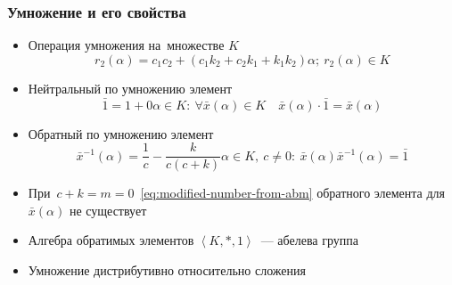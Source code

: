 \documentclass[12pt]{beamer}
\begin{document}
\begin{frame}
  \frametitle{Умножение и его свойства}
  \begin{itemize}
    \item Операция умножения на~множестве $K$
      \begin{equation}
      \label{eq:fuzzy-multiplication}
        r_2\left( \alpha \right)=c_1 c_2+\left(c_1 k_2+ c_2 k_1 +k_1 k_2 \right)\alpha;\ r_2\left( \alpha  \right)\in K
      \end{equation}
    \item Нейтральный по умножению элемент
      \begin{equation}
        \label{eq:fuzzy-one}
        \bar{1}=1+0\alpha \in K:\ \forall \bar{x}\left( \alpha  \right)\in K\quad \bar{x}\left( \alpha  \right)\cdot \bar{1}=\bar{x}\left( \alpha  \right)
      \end{equation}
    \item Обратный по умножению элемент
      \begin{equation}
        \label{eq:fuzzy-division}
        \bar{x}^{-1}(\alpha )=\frac{1}{c}-\frac{k}{c\left(c+k\right)}\alpha \in K,\ c\ne 0:\ \bar{x}\left(\alpha \right){{\bar{x}}^{-1}}\left( \alpha  \right)=\bar{1}
      \end{equation}
    \item При~$c+k=m=0$~\eqref{eq:modified-number-from-abm} обратного элемента для $\bar{x}\left( \alpha  \right)$ не существует
    \item Алгебра обратимых элементов $\left \langle K,*,1 \right \rangle$~--- абелева группа
    \item Умножение дистрибутивно относительно сложения
  \end{itemize}
\end{frame}

\end{document}
